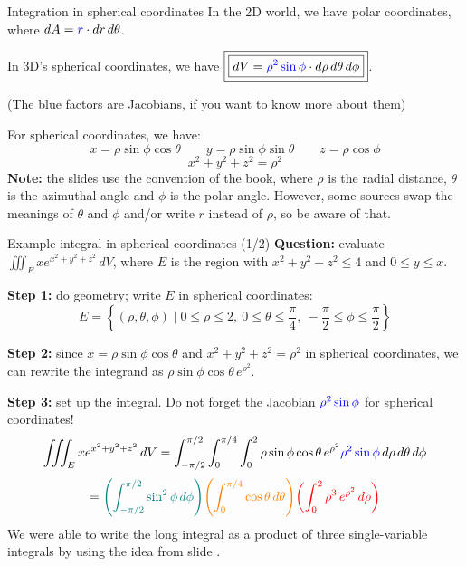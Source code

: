 \begin{frame}{Integration in spherical coordinates}
    In the 2D world, we have polar coordinates, where $dA=\textcolor{blue}{r}\cdot dr\,d\theta$.

    \pause In 3D's spherical coordinates, we have $\boxed{\boxed{dV=\textcolor{blue}{\rho^2\sin\phi}\cdot d\rho\,d\theta \,d\phi}}$.

    {\scriptsize(The blue factors are Jacobians, if you want to know more about them)}

    \pause For spherical coordinates, we have:
        \[\boxed{x=\rho\sin\phi\cos\theta \qquad y=\rho\sin\phi\sin\theta \qquad z=\rho\cos\phi}\]
        \[\boxed{x^2+y^2+z^2=\rho^2}\]
    \pause\textbf{Note:} the slides use the convention of the book, where $\rho$ is the radial distance, $\theta$ is the azimuthal angle and $\phi$ is the polar angle. However, some sources swap the meanings of $\theta$ and $\phi$ and/or write $r$ instead of $\rho$, so be aware of that.
\end{frame}

\begin{frame}{Example integral in spherical coordinates (1/2)}
    \footnotesize
    \textbf{Question:} evaluate $\iiint_E xe^{x^2+y^2+z^2}\,dV$, where $E$ is the region with $x^2+y^2+z^2\leq4$ and $0\leq y\leq x$.

    \pause\textbf{Step 1:} do geometry; write $E$ in spherical coordinates:
    \[E=\left\{(\rho,\theta,\phi) \mid 0\leq\rho\leq2,~0\leq\theta\leq\frac{\pi}{4},~-\frac{\pi}{2}\leq\phi\leq\frac{\pi}{2}\right\}\]

    \pause\textbf{Step 2:} since $x=\rho\sin\phi\cos\theta$ and $x^2+y^2+z^2=\rho^2$ in spherical coordinates, we can rewrite the integrand as $\rho\sin\phi\cos\theta \,e^{\rho^2}$.

    \pause\textbf{Step 3:} set up the integral. Do not forget the Jacobian $\textcolor{blue}{\rho^2\sin\phi}$ for spherical coordinates!
    \[\iiint_E xe^{x^2+y^2+z^2}\,dV = \int_{-\pi/2}^{\pi/2}\int_0^{\pi/4}\int_0^2 \rho\sin\phi\cos\theta\,e^{\rho^2}\textcolor{blue}{\rho^2\sin\phi}\,d\rho\,d\theta\,d\phi\]
    \[=\textcolor{teal}{\left(\int_{-\pi/2}^{\pi/2}\sin^2\phi\,d\phi\right)}\textcolor{orange}{\left(\int_0^{\pi/4}\cos\theta\,d\theta\right)}\textcolor{red}{\left(\int_0^2\rho^3\,e^{\rho^2}\,d\rho\right)}
 \]
    We were able to write the long integral as a product of three single-variable integrals by using the idea from slide \blue{\ref{integraltrick}}.
\end{frame}

